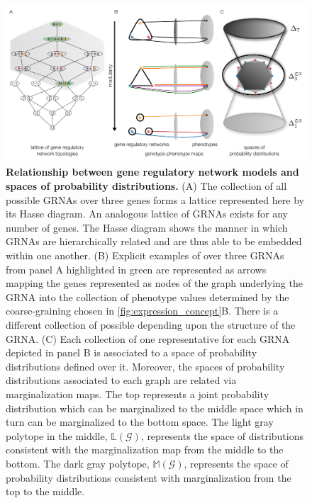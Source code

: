 \begin{figure}[!ht]
\centering
\noindent\includegraphics[width=0.9\columnwidth]{fig/conediagram.pdf}
\caption{{\bf Relationship between gene regulatory network models and spaces of probability distributions.} (A) The collection of all possible GRNAs over three genes forms a lattice represented here by its Hasse diagram. An analogous lattice of GRNAs exists for any number of genes. The Hasse diagram shows the manner in which GRNAs are hierarchically related and are thus able to be embedded within one another. (B) Explicit examples of \gnpm{} over three GRNAs from panel A highlighted in green are represented as arrows mapping the genes represented as nodes of the graph underlying the GRNA into the collection of phenotype values determined by the coarse-graining chosen in \ref{fig:expression_concept}B. There is a different collection of possible \gnpm{} depending upon the structure of the GRNA. (C) Each collection of \gnpm{} one representative for each GRNA depicted in panel B is associated to a space of probability distributions defined over it. Moreover, the spaces of probability distributions associated to each graph are related via marginalization maps. The top represents a joint probability distribution which can be marginalized to the middle space which in turn can be marginalized to the bottom space. The light gray polytope in the middle, $\mathbb{L}(\mathcal{G})$, represents the space of distributions consistent with the marginalization map from the middle to the bottom. The dark gray polytope, $\mathbb{M}(\mathcal{G})$, represents the space of probability distributions consistent with marginalization from the top to the middle.}
\label{fig:conediagram}
\end{figure}

